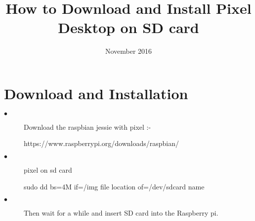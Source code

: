 \documentclass{article}
\title{How to Download and Install Pixel Desktop on SD card}
\date{November 2016}
\begin{document}
\maketitle

\section{Download and Installation}

\begin{description}



\item[$\bullet$] Download the raspbian jessie with pixel :-

https://www.raspberrypi.org/downloads/raspbian/

\item[$\bullet$] pixel on sd card

sudo dd bs=4M if=/img file location of=/dev/sdcard name

\item[$\bullet$] Then wait for a while and insert SD card into the Raspberry pi.

\end{description}
 
\end{document}
